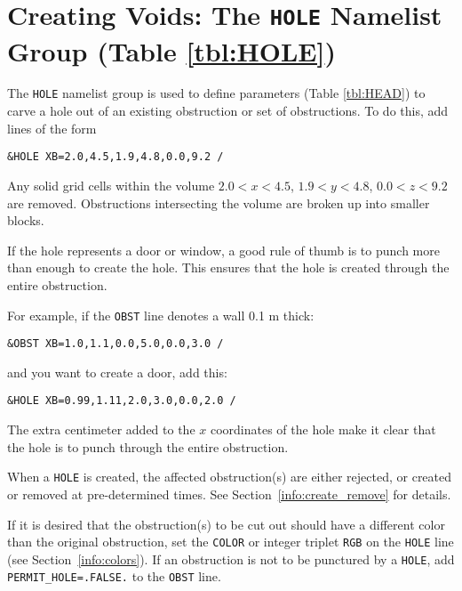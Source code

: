 \documentclass[11pt]{book}
\newcommand{\ct}{\tt\small}
\begin{document}
\section{Creating Voids: The \texorpdfstring{{\tt HOLE}}{HOLE} Namelist Group (Table \ref{tbl:HOLE})}
\label{info:HOLE}

The {\ct HOLE} namelist group is used to define parameters (Table \ref{tbl:HEAD}) to carve a hole
out of an existing obstruction or set of obstructions. To do this, add lines of the form

\footnotesize
\begin{verbatim}
&HOLE XB=2.0,4.5,1.9,4.8,0.0,9.2 /
\end{verbatim}
\normalsize
Any solid grid cells within the volume $2.0<x<4.5$, $1.9<y<4.8$,
$0.0<z<9.2$ are removed. Obstructions intersecting the volume are
broken up into smaller blocks.

\begin{notebox}
\noindent
If the hole represents a door or window, a good rule of thumb is to punch more than enough to create the hole.
This ensures that the hole is created through the entire obstruction.
\end{notebox}

\noindent
For example, if the {\ct OBST} line denotes a wall 0.1 m thick:

\footnotesize
\begin{verbatim}
&OBST XB=1.0,1.1,0.0,5.0,0.0,3.0 /
\end{verbatim}
\normalsize
and you want to create a door, add this:

\footnotesize
\begin{verbatim}
&HOLE XB=0.99,1.11,2.0,3.0,0.0,2.0 /
\end{verbatim}
\normalsize
The extra centimeter added to the $x$ coordinates of the hole make it clear
that the hole is to punch through the entire obstruction.

When a {\ct HOLE} is created, the affected obstruction(s) are either rejected, or
created or removed at pre-determined times. See
Section~\ref{info:create_remove} for details.

If it is desired that the obstruction(s) to be cut out should have a different color
than the original obstruction, set the {\ct COLOR} or integer triplet {\ct RGB} on the {\ct HOLE} line (see Section~\ref{info:colors}).
If an obstruction is not to be punctured by a {\ct HOLE}, add
{\ct PERMIT\_HOLE=.FALSE.} to the {\ct OBST} line.
\end{document}
